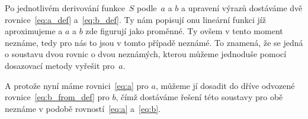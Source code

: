 Po jednotlivém derivování funkce~$S$ podle~$a$ a $b$ a upravení výrazů
dostáváme dvě rovnice~\eqref{eq:a_def} a~\eqref{eq:b_def}. Ty nám popisují onu
lineární funkci jíž aproximujeme a $a$ a $b$ zde figurují jako proměnné. Ty
ovšem v tento moment neznáme, tedy pro nás to jsou v tomto případě neznámé.
To znamená, že se jedná o soustavu dvou rovnic o dvou neznámých, kterou můžeme
jednoduše pomocí dosazovací metody vyřešit pro~$a$.

A protože nyní máme rovnici~\eqref{eq:a} pro $a$, můžeme jí dosadit do dříve
odvozené rovnice~\eqref{eq:b_from_def} pro $b$, čímž dostáváme řešení této
soustavy pro obě neznáme v podobě rovností~\eqref{eq:a} a~\eqref{eq:b}.
